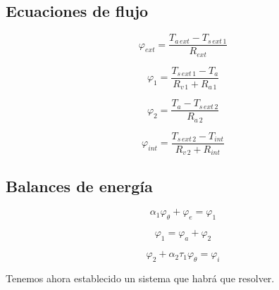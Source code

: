 \documentclass[11pt]{article}
\begin{document}
\subsection{Ecuaciones de flujo}

\[ \varphi _{ ext } = \frac{ T_{ a \, ext } - T_{ s \, ext \, 1 } }{ R_{ ext } } \]

\[ \varphi _1 = \frac{ T_{ s \, ext \, 1} - T_{ a } }{ R_{ v \, 1 } + R_{ a \, 1 } } \]

\[ \varphi _2 = \frac{ T_{ a } - T_{ s \, ext \, 2 } }{ R_{ a \, 2 } } \]

\[ \varphi _{ int } = \frac{ T_{ s \, ext \, 2 } - T_{ int } }{ R_{ v \, 2 } + R_{ int } } \]

\subsection{Balances de energía}

\[ \alpha _1 \varphi _\theta + \varphi _e = \varphi _1 \]

\[ \varphi _1 = \varphi _a + \varphi _2 \]

\[ \varphi _2 + \alpha _2 \tau _1 \varphi _\theta = \varphi _i \]

Tenemos ahora establecido un sistema que habrá que resolver.

\end{document}
